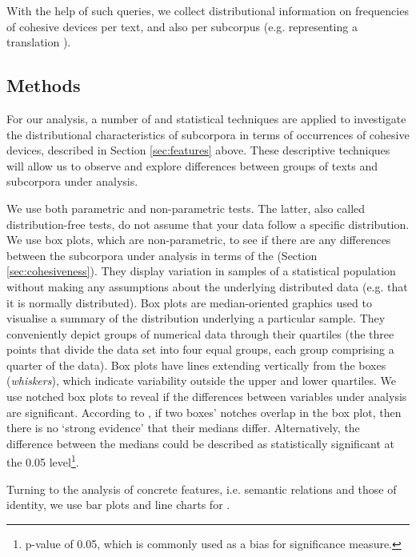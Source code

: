 \documentclass[output=paper]{langsci/langscibook.cls}
\begin{document}
With the help of such queries, we collect distributional information on frequencies of cohesive devices per text, and also per subcorpus (e.g. representing a translation ).



\subsection{Methods}\label{sec:method}
\largerpage
For our analysis, a number of  and statistical techniques are applied to investigate the dis\-tri\-bu\-tional characteristics of subcorpora in terms of occurrences of cohesive devices, described in Section \ref{sec:features} above. These descriptive techniques will allow us to observe and explore differences between groups of texts and subcorpora under analysis.

We use both parametric and non-parametric tests. The latter, also called dis\-tri\-bu\-tion-free tests, do not assume that your data follow a specific distribution. We use box plots, which are non-parametric, to see if there are any differences between the subcorpora under analysis in terms of the  (Section \ref{sec:cohesiveness}). They display variation in samples of a statistical population without making any assumptions about the underlying distributed data (e.g. that it is normally distributed). Box plots are median-oriented graphics used to visualise a summary of the distribution underlying a particular sample. They conveniently depict groups of numerical data through their quartiles (the three points that divide the data set into four equal groups, each group comprising a quarter of the data). Box plots have lines extending vertically from the boxes (\textsl{whiskers}), which indicate variability outside the upper and lower quartiles. We use notched box plots to reveal if the differences between variables under analysis are significant. According to \citet{ChambersEtAl1983}, if two boxes' notches overlap in the box plot, then there is no `strong evidence' that their medians differ. %
Alternatively, the difference between the medians could be described as statistically significant at the 0.05 level\footnote{p-value of 0.05, which is commonly used as a bias for significance measure.}.
 
Turning to the analysis of concrete features, i.e. semantic relations and those of identity, we use bar plots and line charts for .
\end{document}
